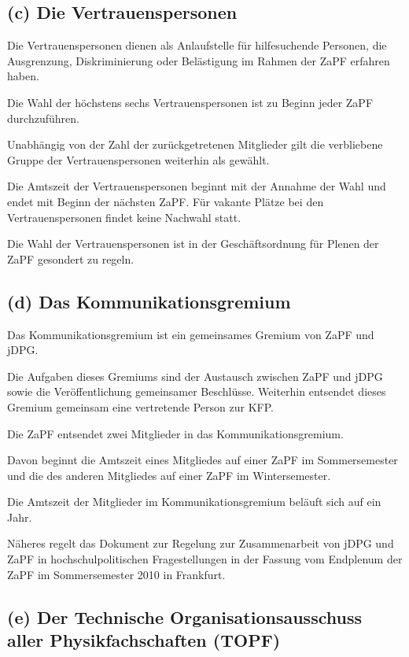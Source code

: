 \documentclass[12pt,oneside]{scrartcl}
\begin{document}
\subsection{(c) Die Vertrauenspersonen%
  \label{c-die-vertrauenspersonen}%
}

Die Vertrauenspersonen dienen als Anlaufstelle für hilfesuchende Personen, die
Ausgrenzung, Diskriminierung oder Belästigung im Rahmen der ZaPF erfahren haben.

Die Wahl der höchstens sechs Vertrauenspersonen ist zu Beginn jeder ZaPF durchzuführen.

Unabhängig von der Zahl der zurückgetretenen Mitglieder gilt die verbliebene
Gruppe der Vertrauenspersonen weiterhin als gewählt.

Die Amtszeit der Vertrauenspersonen beginnt mit der Annahme der Wahl und endet
mit Beginn der nächsten ZaPF. Für vakante Plätze bei den Vertrauenspersonen
findet keine Nachwahl statt.

Die Wahl der Vertrauenspersonen ist in der Geschäftsordnung für Plenen der ZaPF
gesondert zu regeln.


\subsection{(d) Das Kommunikationsgremium%
  \label{d-das-kommunikationsgremium}%
}

Das Kommunikationsgremium ist ein gemeinsames Gremium von ZaPF und jDPG.

Die Aufgaben dieses Gremiums sind der Austausch zwischen ZaPF und jDPG sowie
die Veröffentlichung gemeinsamer Beschlüsse.
Weiterhin entsendet dieses Gremium gemeinsam eine vertretende Person zur KFP.

Die ZaPF entsendet zwei Mitglieder in das Kommunikationsgremium.

Davon beginnt die Amtszeit eines Mitgliedes auf einer ZaPF im Sommersemester und
die des anderen Mitgliedes auf einer ZaPF im Wintersemester.

Die Amtszeit der Mitglieder im Kommunikationsgremium beläuft sich auf ein Jahr.

Näheres regelt das Dokument zur \textquotedbl{}Regelung zur Zusammenarbeit von jDPG und ZaPF
in hochschulpolitischen Fragestellungen\textquotedbl{} in der Fassung vom Endplenum der ZaPF
im Sommersemester 2010 in Frankfurt.


\subsection{(e) Der Technische Organisationsausschuss aller Physikfachschaften (TOPF)%
  \label{e-der-technische-organisationsausschuss-aller-physikfachschaften-topf}%
}
\end{document}
